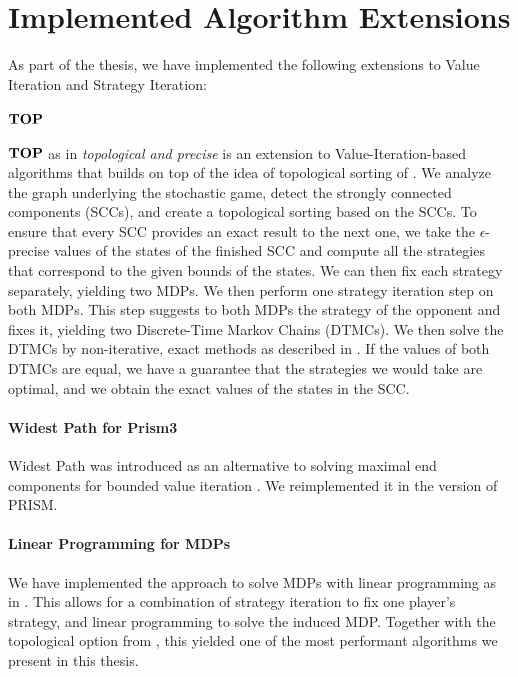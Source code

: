 \chapter{Implemented Algorithm Extensions} \label{ch:implementedAlgos}
As part of the thesis, we have implemented the following extensions to Value Iteration and Strategy Iteration:

\subsubsection*{$\mathbf{TOP}$} $\mathbf{TOP}$ as in \emph{topological and precise} is an extension to Value-Iteration-based algorithms that builds on top of the idea of topological sorting of \cite{Gandalf}.
We analyze the graph underlying the stochastic game, detect the strongly connected components (SCCs), and create a topological sorting based on the SCCs.
To ensure that every SCC provides an exact result to the next one, we take the $\epsilon$-precise values of the states of the finished SCC and compute all the
strategies that correspond to the given bounds of the states.
We can then fix each strategy separately, yielding two MDPs. We then perform one strategy iteration step on both MDPs. This step suggests to both MDPs the strategy
of the opponent and fixes it, yielding two Discrete-Time Markov Chains (DTMCs). We then solve the DTMCs by non-iterative, exact methods as described in \cite{BaierBook}.
If the values of both DTMCs are equal, we have a guarantee that the strategies we would take are optimal, and we obtain the exact values of the states in the SCC.

\subsubsection*{Widest Path for Prism3}
Widest Path was introduced as an alternative to solving maximal end components for bounded value iteration \cite*{WidestPath}.
We reimplemented it in the version of PRISM.

\subsubsection*{Linear Programming for MDPs}
We have implemented the approach to solve MDPs with linear programming as in \cite{ANY BOOK}. 
This allows for a combination of strategy iteration to fix one player's strategy, and linear programming to solve the induced MDP.
Together with the topological option from \cite{GANDALF}, this yielded one of the most performant algorithms we present in this thesis.